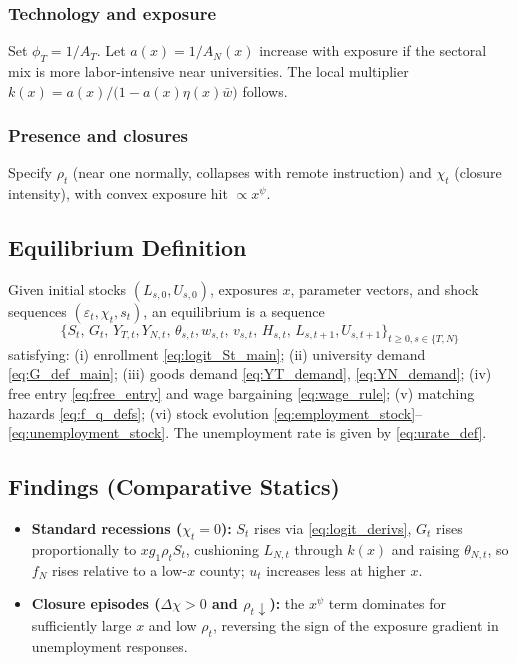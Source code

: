 \subsubsection*{Technology and exposure}
Set $\phi_T=1/A_T$. Let $a(x)=1/A_N(x)$ increase with exposure if the sectoral mix is more labor-intensive near universities. The local multiplier $k(x)=a(x)/\big(1-a(x)\eta(x)\bar w\big)$ follows.

\subsubsection*{Presence and closures}
Specify $\rho_t$ (near one normally, collapses with remote instruction) and $\chi_t$ (closure intensity), with convex exposure hit $\propto x^\psi$.

\subsection*{Equilibrium Definition}
Given initial stocks $(L_{s,0},U_{s,0})$, exposures $x$, parameter vectors, and shock sequences $(\varepsilon_t,\chi_t,s_t)$, an equilibrium is a sequence
\[
\big\{S_t,\,G_t,\,Y_{T,t},Y_{N,t},\,\theta_{s,t},w_{s,t},\,v_{s,t},\,H_{s,t},\,L_{s,t+1},U_{s,t+1}\big\}_{t\ge 0,s\in\{T,N\}}
\]
satisfying: (i) enrollment \eqref{eq:logit_St_main}; (ii) university demand \eqref{eq:G_def_main}; (iii) goods demand \eqref{eq:YT_demand}, \eqref{eq:YN_demand}; (iv) free entry \eqref{eq:free_entry} and wage bargaining \eqref{eq:wage_rule}; (v) matching hazards \eqref{eq:f_q_defs}; (vi) stock evolution \eqref{eq:employment_stock}–\eqref{eq:unemployment_stock}. The unemployment rate is given by \eqref{eq:urate_def}.

\subsection*{Findings (Comparative Statics)}
\begin{itemize}
	\item \textbf{Standard recessions ($\chi_t=0$):} $S_t$ rises via \eqref{eq:logit_derivs}, $G_t$ rises proportionally to $x g_1\rho_tS_t$, cushioning $L_{N,t}$ through $k(x)$ and raising $\theta_{N,t}$, so $f_N$ rises relative to a low-$x$ county; $u_t$ increases less at higher $x$.
	\item \textbf{Closure episodes ($\Delta\chi>0$ and $\rho_t\downarrow$):} the $x^\psi$ term dominates for sufficiently large $x$ and low $\rho_t$, reversing the sign of the exposure gradient in unemployment responses.
\end{itemize}


